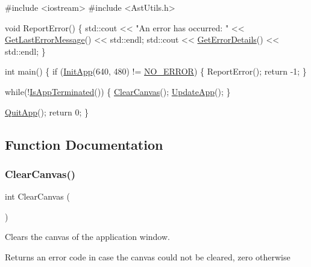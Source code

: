 \begin{DoxyCode}
\textcolor{preprocessor}{#include <iostream>}
\textcolor{preprocessor}{#include <AstUtils.h>}

\textcolor{keywordtype}{void} ReportError()
\{
    std::cout << \textcolor{stringliteral}{"An error has occurred: "} << \hyperlink{group__error__group_gac9be83c8ac2a5d80a2be46487c596eab}{GetLastErrorMessage}() << std::endl;
    std::cout << \hyperlink{group__error__group_ga8258f5044a56ed71aeed5633fc8341b6}{GetErrorDetails}() << std::endl;
\}

\textcolor{keywordtype}{int} main()
\{
    \textcolor{keywordflow}{if} (\hyperlink{group__sdl__group_ga8f43e7993cf196bb0af33a60bc93aa75}{InitApp}(640, 480) != \hyperlink{group__error__group_gga59e56af19e754a6aa26a612ebf91d05fabf350750d0d4fabd8954c0f1e9bbae94}{NO\_ERROR}) \{
        ReportError();
        \textcolor{keywordflow}{return} -1;
    \}

    \textcolor{keywordflow}{while}(!\hyperlink{group__sdl__group_ga6d29aa641d22a0299da4710022c8c96b}{IsAppTerminated}()) \{
        \hyperlink{group__sdl__group_ga4cc0ada571b47d2b809d441fa6766b52}{ClearCanvas}();
        \hyperlink{group__sdl__group_ga9bf9bfe01e7d336c3a3b13cc923ff850}{UpdateApp}();
    \}

    \hyperlink{group__sdl__group_gaf4cba1685a7c46bccc7bbdf863114cee}{QuitApp}();
    \textcolor{keywordflow}{return} 0;
\} 
\end{DoxyCode}
 

\subsection{Function Documentation}
\mbox{\label{group__sdl__group_ga4cc0ada571b47d2b809d441fa6766b52}} 
\subsubsection{\texorpdfstring{Clear\+Canvas()}{ClearCanvas()}}
{\footnotesize\ttfamily int Clear\+Canvas (\begin{DoxyParamCaption}{ }\end{DoxyParamCaption})}

Clears the canvas of the application window.

\begin{DoxyReturn}{Returns}
an error code in case the canvas could not be cleared, zero otherwise 
\end{DoxyReturn}
\mbox{\label{group__sdl__group_ga9b9387d774c6bc63e5e3c6c91296dedb}} 
